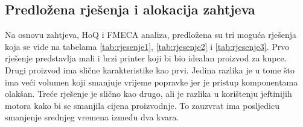 \documentclass[12pt]{article}
\begin{document}
\subsection{Predložena rješenja i alokacija zahtjeva}

Na osnovu zahtjeva, HoQ i FMECA analiza, predložena su tri moguća rješenja koja se vide na tabelama \ref{tab:rjesenje1}, \ref{tab:rjesenje2} i \ref{tab:rjesenje3}. Prvo rješenje predstavlja mali i brzi printer koji bi bio idealan proizvod za kupce. Drugi proizvod ima slične karakteristike kao prvi. Jedina razlika je u tome što ima veći volumen koji smanjuje vrijeme popravke jer je pristup komponentama olakšan. Treće rješenje je slično kao drugo, ali je razlika u korištenju jeftinijih motora kako bi se smanjila cijena proizvodnje. To zauzvrat ima posljedicu smanjenje srednjeg vremena između dva kvara.
\end{document}
